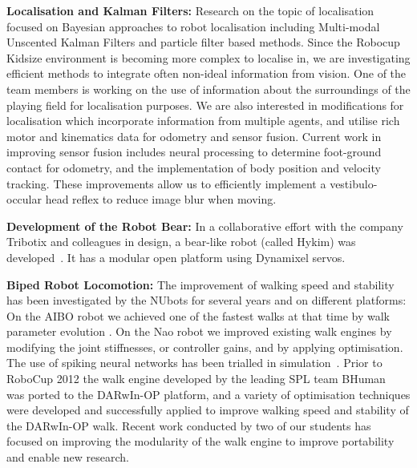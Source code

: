 \documentclass{llncs}
\begin{document}
\noindent\textbf{Localisation and Kalman Filters:} Research on the topic of localisation focused on Bayesian approaches to robot localisation including Multi-modal Unscented Kalman Filters and particle filter based methods. Since the Robocup Kidsize environment is becoming more complex to localise in, we are investigating efficient methods to integrate often non-ideal information from vision. One of the team members is working on the use of information about the surroundings of the playing field for localisation purposes. We are also interested in modifications for localisation which incorporate information from multiple agents, and utilise rich motor and kinematics data for odometry and sensor fusion. Current work in  improving sensor fusion includes neural processing to determine foot-ground contact for odometry, and the implementation of body position and velocity tracking. These improvements allow us to efficiently implement a vestibulo-occular head reflex to reduce image blur when moving.

\noindent\textbf{Development of the Robot Bear:} In a collaborative effort with the company Tribotix and colleagues in design, a bear-like robot (called Hykim) was developed~\cite{ChalupEtAl2006}. It has a modular open platform using Dynamixel servos.

\noindent\textbf{Biped Robot Locomotion:} The improvement of walking speed and stability has been investigated by the NUbots for several years and on different platforms: On the AIBO robot we achieved one of the fastest walks at that time by walk parameter evolution \cite{QuinlanEtAlACRA2003,ChalupEtAlSMC2007}. On the Nao robot we improved existing walk engines by modifying the joint stiffnesses, or controller gains, \cite{Kulk2008,Kulk2010} and by applying optimisation. %
The use of spiking neural networks has been trialled in simulation~\cite{WiklendtChalup2008}. Prior to RoboCup 2012 the walk engine developed by the leading SPL team BHuman~\cite{BHumanWalk2010} was ported to the DARwIn-OP platform, and a variety of optimisation techniques were developed and successfully applied to improve walking speed and stability of the DARwIn-OP walk. Recent work conducted by two of our students has focused on improving the modularity of the walk engine to improve portability and enable new research. %
\end{document}
